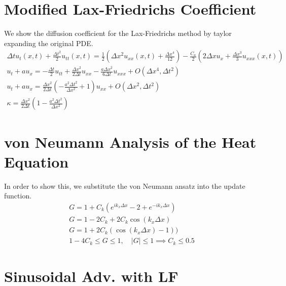 \documentclass{article}
\begin{document}
\section{Modified Lax-Friedrichs Coefficient}

We show the diffusion coefficient for the Lax-Friedrichs method by taylor
expanding the original PDE. 
\begin{gather*}
    \Delta t u_t(x,t) + \frac{\Delta t^2}{2} u_{tt}(x,t)  =
    \frac{1}{2}\left(\Delta x^2u_{xx}(x,t) + \frac{\Delta x^4}{12} \right) -
    \frac{C_a}{2}\left(2\Delta x u_x + \frac{\Delta x^3}{3}u_{xxx}(x,t) \right)\\
    u_t + a u_x = - \frac{\Delta t}{2} u_{tt} + \frac{\Delta x^2}{2\Delta
    t}u_{xx} - \frac{a\Delta x^2}{6\Delta t}u_{xxx} + O(\Delta x^4, \Delta
    t^2)\\
    u_t + a u_x = \frac{\Delta x^2}{2\Delta t}\left(-\frac{a^2\Delta t^2}{\Delta
    x^2} + 1\right)u_{xx} + O(\Delta x^2, \Delta t^2)\\
    \kappa = \frac{\Delta x^2}{2\Delta t}\left(1-\frac{a^2\Delta t^2}{\Delta
    x^2}\right)
\end{gather*}

\section{von Neumann Analysis of the Heat Equation}

In order to show this, we substitute the von Neumann ansatz into the update
function.  
\begin{gather*}
    G = 1 + C_k\left(e^{ik_x\Delta x} - 2 + e^{-ik_x\Delta x}\right)\\
    G = 1 - 2C_k + 2C_k\cos(k_x\Delta x) \\
    G = 1 + 2C_k(\cos(k_x\Delta x) -1))\\
    1 - 4C_k \le G \le 1,\quad |G| \le 1  \implies C_k \le 0.5
\end{gather*}

\section{Sinusoidal Adv. with LF}
\end{document}
